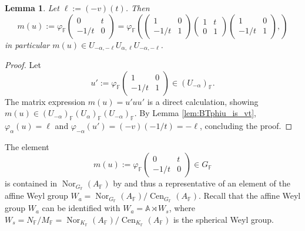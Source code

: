 \documentclass[12pt]{amsart}
\newcommand{\F}{\mathbb{F} }
\newcommand{\K}{\mathbb{K}}
\newcommand{\frakg}{\mathfrak{g}}
\newcommand{\A}{\mathbb{A}}
\numberwithin{equation}{section}
\newtheorem{lemma}[theorem]{Lemma}
\theoremstyle{remark} %
\begin{document}
	
	\begin{lemma}\label{lem:BTm_uuu}
		Let $\ell := (-v)(t)$. Then
		$$
		m(u) := \varphi_\F\begin{pmatrix}
			0 & t \\ -1/t & 0
		\end{pmatrix} = \varphi_\F \left(
		\begin{pmatrix}
			1 & 0 \\ -1/t & 1
		\end{pmatrix}\begin{pmatrix}
			1 & t \\ 0 & 1
		\end{pmatrix}\begin{pmatrix}
			1 & 0 \\ -1/t & 1
		\end{pmatrix},
		\right)
		$$
		in particular $m(u) \in U_{-\alpha,-\ell} U_{\alpha, \ell} U_{-\alpha,-\ell}$.
	\end{lemma}
	\begin{proof}
		Let 
		$$
		u' := \varphi_\F\begin{pmatrix}
			1 & 0 \\ -1/t & 1
		\end{pmatrix}  \in (U_{-\alpha})_\F.
		$$
		The matrix expression $m(u) = u' u u'$ is a direct calculation, showing $m(u) \in (U_{-\alpha})_\F(U_\alpha )_\F (U_{-\alpha})_\F$. By Lemma \ref{lem:BTphiu_is_vt}, $\varphi_\alpha(u) = \ell$ and $\varphi_{-\alpha}(u') = (-v)(-1/t) = -\ell$, concluding the proof.
	\end{proof}
	The element 
	$$
	m(u) := \varphi_\F \begin{pmatrix}
		0 & t \\ -1/t & 0
	\end{pmatrix} \in G_\F
	$$
	is contained in $ \operatorname{Nor}_{G_\F}(A_\F)$ by \cite[Lemma \ref{I-lem:Jacobson_Morozov_m}]{AppAGRCF} and thus a representative of an element of the affine Weyl group $W_a = \operatorname{Nor}_{G_\F}(A_\F)/\operatorname{Cen}_{G_\F}(A_\F) $. Recall that the affine Weyl group $W_a$ can be identified with $W_a = \A \rtimes W_s $, where $W_s = N_\F/M_\F= \operatorname{Nor}_{K_\F}(A_\F)/\operatorname{Cen}_{K_\F}(A_\F)$ is the spherical Weyl group.
	
\end{document}
